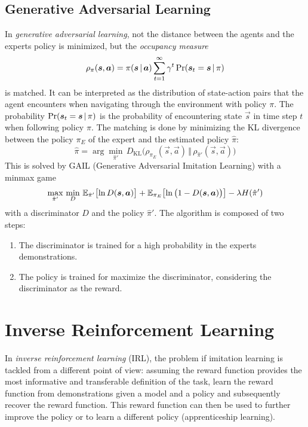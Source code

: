 		\subsection{Generative Adversarial Learning}
			In \emph{generative adversarial learning}, not the distance between the agents and the experts policy is minimized, but the \emph{occupancy measure}
			\begin{equation*}
				\rho_\pi(\bm{s}, \bm{a}) = \pi(\bm{s} \,\vert\, \bm{a}) \sum_{t = 1}^{\infty} \gamma^t \Pr(\bm{s}_t = \bm{s} \,\vert\, \pi)
			\end{equation*}
			is matched. It can be interpreted as the distribution of state-action pairs that the agent encounters when navigating through the environment with policy \(\pi\). The probability \( \Pr(\bm{s}_t = \bm{s} \,\vert\, \pi) \) is the probability of encountering state \(\vec{s}\) in time step \(t\) when following policy \(\pi\). The matching is done by minimizing the KL divergence between the policy \(\pi_E\) of the expert and the estimated policy \(\hat{\pi}\):
			\begin{equation*}
				\hat{\pi} = \arg\min_{\hat{\pi}'}\, D_\mathrm{KL}\big( \rho_{\pi_E}(\vec{s}, \vec{a}) \,\big\Vert\, \rho_{\hat{\pi}'}(\vec{s}, \vec{a}) \big)
			\end{equation*}
			This is solved by GAIL (Generative Adversarial Imitation Learning) with a minmax game
			\begin{equation*}
				\max_{\hat{\pi}'} \, \min_D \, \mathbb{E}_{\hat{\pi}'}\big[\! \ln D(\bm{s}, \bm{a}) \big] + \mathbb{E}_{\pi_E}\big[\! \ln\big( 1 - D(\bm{s}, \bm{a}) \big) \big] - \lambda H(\hat{\pi}')
			\end{equation*}
			with a discriminator \(D\) and the policy \(\hat{\pi}'\). The algorithm is composed of two steps:
			\begin{enumerate}
				\item The discriminator is trained for a high probability in the experts demonstrations.
				\item The policy is trained for maximize the discriminator, considering the discriminator as the reward.
			\end{enumerate}

	\section{Inverse Reinforcement Learning}
		In \emph{inverse reinforcement learning} (IRL), the problem if imitation learning is tackled from a different point of view: assuming the reward function provides the most informative and transferable definition of the task, learn the reward function from demonstrations given a model and a policy and subsequently recover the reward function. This reward function can then be used to further improve the policy or to learn a different policy (apprenticeship learning).

